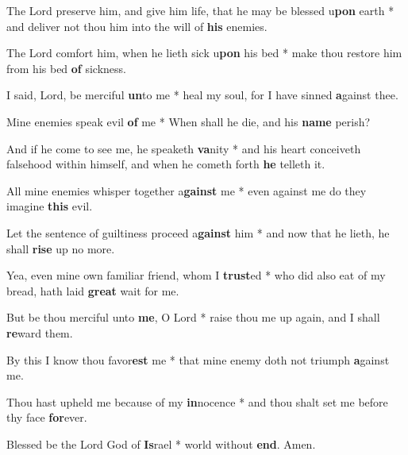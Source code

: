 \begin{multicols}{2}
	The Lord preserve him, and give him life, that he may be blessed u\textbf{pon} earth * and deliver not thou him into the will of \textbf{his} enemies.
	
	The Lord comfort him, when he lieth sick u\textbf{pon} his bed * make thou restore him from his bed \textbf{of} sickness.
	
	I said, Lord, be merciful \textbf{un}to me * heal my soul, for I have sinned \textbf{a}gainst thee.
	
	Mine enemies speak evil \textbf{of} me * When shall he die, and his \textbf{name} perish?
	
	And if he come to see me, he speaketh \textbf{va}nity * and his heart conceiveth falsehood within himself, and when he cometh forth \textbf{he} telleth it.
	
	All mine enemies whisper together a\textbf{gainst} me * even against me do they imagine \textbf{this} evil.
	
	Let the sentence of guiltiness proceed a\textbf{gainst} him * and now that he lieth, he shall \textbf{rise} up no more.
	
	Yea, even mine own familiar friend, whom I \textbf{trust}ed * who did also eat of my bread, hath laid \textbf{great} wait for me.
	
	But be thou merciful unto \textbf{me}, O Lord * raise thou me up again, and I shall \textbf{re}ward them.
	
	By this I know thou favor\textbf{est} me * that mine enemy doth not triumph \textbf{a}gainst me.
	
	Thou hast upheld me because of my \textbf{in}nocence * and thou shalt set me before thy face \textbf{for}ever.
	
	Blessed be the Lord God of \textbf{Is}rael * world without \textbf{end}. Amen.
\end{multicols}